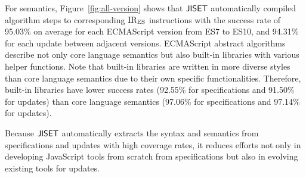 For semantics, Figure~\ref{fig:all-version} shows that \( \text{\sf JISET} \) automatically
compiled algorithm steps to corresponding \( \text{IR}_\text{ES} \) instructions with
the success rate of 95.03\% on average for each ECMAScript version
from ES7 to ES10, and 94.31\% for each update between adjacent
versions.  ECMAScript abstract algorithms describe not only
core language semantics but also built-in libraries with various helper functions.
Note that built-in libraries are written in more diverse styles than
core language semantics due to their own specific functionalities.
Therefore, built-in libraries have lower success rates
(92.55\% for specifications and 91.50\% for updates) than core
language semantics (97.06\% for specifications and 97.14\% for
updates).

Because \( \text{\sf JISET} \) automatically extracts the syntax
and semantics from specifications and updates with high coverage rates,
it reduces efforts not only in developing JavaScript tools from scratch
from specifications but also in evolving existing tools for updates.



